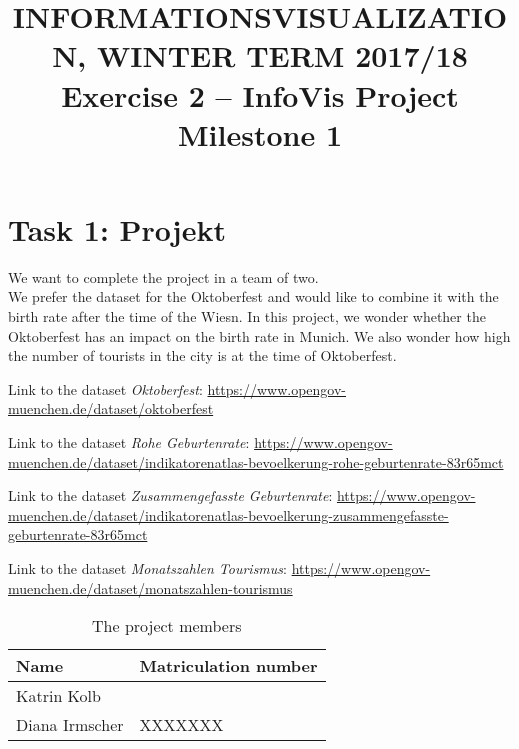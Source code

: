 \documentclass[11pt, twoside, BCOR=8mm, DIV=12]{scrartcl}
\title{{\Large INFORMATIONSVISUALIZATION, WINTER TERM 2017/18} \\ Exercise 2 – InfoVis Project Milestone 1}
\begin{document}
\maketitle
\section*{Task 1: Projekt}
We want to complete the project in a team of two.\\
We prefer the dataset for the Oktoberfest and would like to combine it with the birth rate after the time of the Wiesn. In this project, we wonder whether the Oktoberfest has an impact on the birth rate in Munich.
We also wonder how high the number of tourists in the city is at the time of Oktoberfest.
\begin{description}
\item Link to the dataset \textit{Oktoberfest}: \url{https://www.opengov-muenchen.de/dataset/oktoberfest}
\item Link to the dataset \textit{Rohe Geburtenrate}: \url{https://www.opengov-muenchen.de/dataset/indikatorenatlas-bevoelkerung-rohe-geburtenrate-83r65mct}
\item Link to the dataset \textit{Zusammengefasste Geburtenrate}: 
\url{https://www.opengov-muenchen.de/dataset/indikatorenatlas-bevoelkerung-zusammengefasste-geburtenrate-83r65mct}
\item Link to the dataset \textit{Monatszahlen Tourismus}: \url{https://www.opengov-muenchen.de/dataset/monatszahlen-tourismus}
\end{description}

\begin{table}
\centering

\begin{tabular}{l | l}
Name & Matriculation number \\
 \toprule
Katrin Kolb & \\
\midrule
Diana Irmscher & XXXXXXX \\
\bottomrule
\end{tabular}
\caption{The project members}
\end{table}
\end{document}

